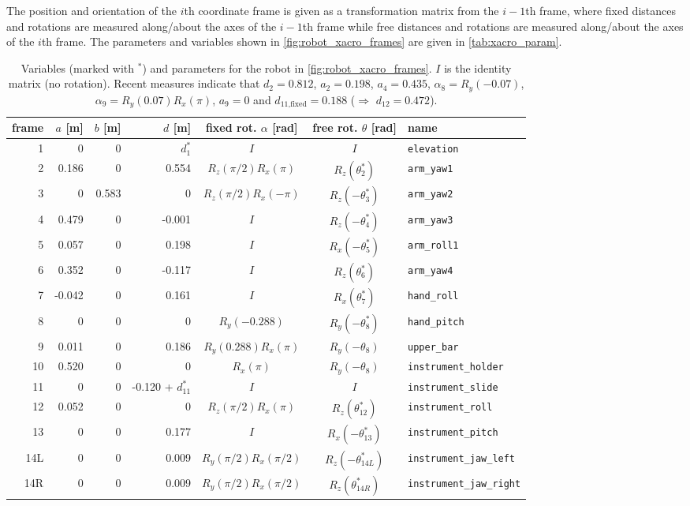 The position and orientation of the $i$th coordinate frame is given as a transformation matrix from the $i-1$th frame, where fixed distances and rotations are measured along/about the axes of the $i-1$th frame while free distances and rotations are measured along/about the axes of the $i$th frame. The parameters and variables shown in \autoref{fig:robot_xacro_frames} are given in \autoref{tab:xacro_param}.

\begin{table}[htbp]
	\begin{tabular}{r | rrr c c l}
		frame  & $a$ [m] & $b$ [m] & $d$ [m] & fixed rot. $\alpha$ [rad] & free rot. $\theta$ [rad] & name\\\hline
		1 & 0 & 0 & $d_1^*$ & $I$ & $I$ & \texttt{elevation}\\
		2 & 0.186 & 0 & 0.554 & $R_z(\pi/2)R_x(\pi)$ & $R_z(\theta_2^*)$ & \texttt{arm\_yaw1} \\
		3 & 0 & 0.583 & 0 & $R_z(\pi/2)R_x(-\pi)$ & $R_z(-\theta_3^*)$ & \texttt{arm\_yaw2} \\
		4 & 0.479 & 0 & -0.001 & $I$ & $R_z(-\theta_4^*)$ & \texttt{arm\_yaw3} \\
		5 & 0.057 & 0 & 0.198 & $I$ & $R_x(-\theta_5^*)$ & \texttt{arm\_roll1} \\
		6 & 0.352 & 0 & -0.117 & $I$ & $R_z(\theta_6^*)$ & \texttt{arm\_yaw4} \\
		7 & -0.042 & 0 & 0.161 & $I$ & $R_x(\theta_7^*)$ & \texttt{hand\_roll} \\
		8 & 0 & 0 & 0 & $R_y(-0.288)$ & $R_y(-\theta_8^*)$ & \texttt{hand\_pitch} \\
		9 & 0.011 & 0 & 0.186 & $R_y(0.288)R_x(\pi)$ & $R_y(-\theta_8)$ & \texttt{upper\_bar} \\
		10 & 0.520 & 0 & 0 & $R_x(\pi)$ & $R_y(-\theta_8)$ & \texttt{instrument\_holder} \\
		11 & 0 & 0 & -0.120 + $d_{11}^*$ & $I$ & $I$ & \texttt{instrument\_slide} \\
		12 & 0.052 & 0 & 0 & $R_z(\pi/2)R_x(\pi)$ & $R_z(\theta_{12}^*)$ & \texttt{instrument\_roll} \\
		13 & 0 & 0 & 0.177 & $I$ & $R_x(-\theta_{13}^*)$ & \texttt{instrument\_pitch} \\
		14L & 0 & 0 & 0.009 & $R_y(\pi/2)R_x(\pi/2)$ & $R_z(-\theta_{14L}^*)$ & \texttt{instrument\_jaw\_left} \\
		14R & 0 & 0 & 0.009 & $R_y(\pi/2)R_x(\pi/2)$ & $R_z(\theta_{14R}^*)$ & \texttt{instrument\_jaw\_right} \\
	\end{tabular}
	\caption{Variables (marked with $^*$) and parameters for the robot in \autoref{fig:robot_xacro_frames}. $I$ is the identity matrix (no rotation). Recent measures indicate that $d_2=0.812$, $a_2=0.198$, $a_4=0.435$, $\alpha_8=R_y(-0.07)$, $\alpha_9=R_y(0.07)R_x(\pi)$, $a_9=0$ and $d_\text{11,fixed}=0.188$ ($\Rightarrow$ $d_{12}=0.472$).}
	\label{tab:xacro_param}
\end{table}


